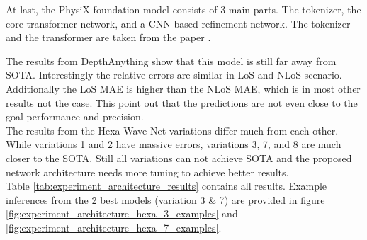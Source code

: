 		At last, the PhysiX foundation model consists of 3 main parts. The tokenizer, the core transformer network, and a CNN-based refinement network. The tokenizer and the transformer are taken from the  paper \cite{nguyen2025physixfoundationmodelphysics}\cite{nvidia2025cosmosworldfoundationmodel}.
		
		The results from DepthAnything show that this model is still far away from SOTA. Interestingly the relative errors are similar in LoS and NLoS scenario. Additionally the LoS MAE is higher than the NLoS MAE, which is in most other results not the case. This point out that the predictions are not even close to the goal performance and precision.\\
		The results from the Hexa-Wave-Net variations differ much from each other. While variations 1 and 2 have massive errors, variations 3, 7, and 8 are much closer to the SOTA. Still all variations can not achieve SOTA and the proposed network architecture needs more tuning to achieve better results.\\
		Table \ref{tab:experiment_architecture_results} contains all results. Example inferences from the 2 best models (variation 3 \& 7) are provided in figure \ref{fig:experiment_architecture_hexa_3_examples} and \ref{fig:experiment_architecture_hexa_7_examples}.
		
		
